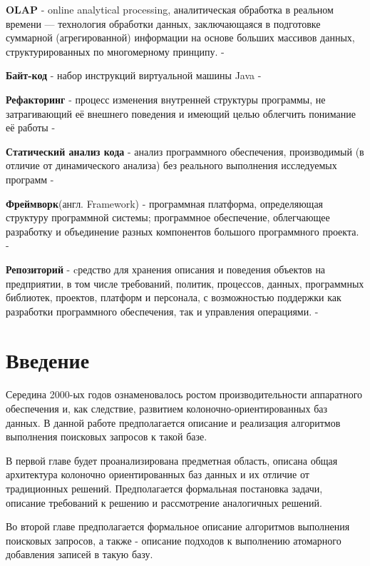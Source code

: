 \documentclass{matmex-diploma}
\begin{document}
    \textbf{OLAP} - online analytical processing, аналитическая обработка в реальном времени — технология обработки данных, заключающаяся в подготовке суммарной (агрегированной) информации на основе больших массивов данных, структурированных по многомерному принципу. - \cite{gartner}
    
    \textbf{Байт-код} - набор инструкций виртуальной машины Java - \cite{jvm:spec}
    
    \textbf{Рефакторинг} - процесс изменения внутренней структуры программы, не затрагивающий её внешнего поведения и имеющий целью облегчить понимание её работы - \cite{fowler}
    
    \textbf{Статический анализ кода} - анализ программного обеспечения, производимый (в отличие от динамического анализа) без реального выполнения исследуемых программ - \cite{wichmann1995industrial}
    
    \textbf{Фреймворк}(англ. Framework) - программная платформа, определяющая структуру программной системы; программное обеспечение, облегчающее разработку и объединение разных компонентов большого программного проекта. - \cite{wiki:framework}
    
    \textbf{Репозиторий} - cредство для хранения описания и поведения объектов на предприятии, в том числе требований, политик, процессов, данных, программных библиотек, проектов, платформ и персонала, с возможностью поддержки как разработки программного обеспечения, так и управления операциями. - \cite{gartner}
    
\section*{Введение}
    Середина 2000-ых годов ознаменовалось ростом производительности аппаратного обеспечения и, как следствие, развитием колоночно-ориентированных баз данных. В данной работе предполагается описание и реализация алгоритмов выполнения поисковых запросов к такой базе.
    
    В первой главе будет проанализирована предметная область, описана общая архитектура колоночно ориентированных баз данных и их отличие от традиционных решений. Предполагается формальная постановка задачи, описание требований к решению и рассмотрение аналогичных решений.
    
    Во второй главе предполагается формальное описание алгоритмов выполнения поисковых запросов, а также - описание подходов к выполнению атомарного добавления записей в такую базу.
    
\end{document}
